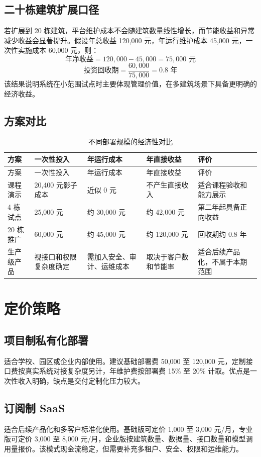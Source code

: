 \documentclass[12pt,a4paper]{ctexart}
\begin{document}
\subsection{二十栋建筑扩展口径}
若扩展到 20 栋建筑，平台维护成本不会随建筑数量线性增长，而节能收益和异常减少收益会显著提升。假设年总收益 120,000 元，年运行维护成本 45,000 元，一次性实施成本 60,000 元，则：
\[
\text{年净收益}=120,000-45,000=75,000 \text{ 元}
\]
\[
\text{投资回收期}=\frac{60,000}{75,000}=0.8 \text{ 年}
\]
该结果说明系统在小范围试点时主要体现管理价值，在多建筑场景下具备更明确的经济收益。

\subsection{方案对比}
\begin{longtable}{L{3cm}L{3.2cm}L{3.2cm}L{3.2cm}L{2cm}}
\caption{不同部署规模的经济性对比}\\
\toprule
方案 & 一次性投入 & 年运行成本 & 年直接收益 & 评价 \\
\midrule
\endfirsthead
\toprule
方案 & 一次性投入 & 年运行成本 & 年直接收益 & 评价 \\
\midrule
\endhead
课程演示 & 20,400 元影子成本 & 近似 0 元 & 不产生直接收入 & 适合课程验收和能力展示 \\
4 栋试点 & 25,000 元 & 约 30,000 元 & 约 42,000 元 & 第二年起具备正向收益 \\
20 栋推广 & 60,000 元 & 约 45,000 元 & 约 120,000 元 & 回收期约 0.8 年 \\
生产级产品 & 视接口和权限复杂度确定 & 需加入安全、审计、运维成本 & 取决于客户数和节能率 & 适合后续产品化，不属于本期范围 \\
\bottomrule
\end{longtable}

\section{定价策略}
\subsection{项目制私有化部署}
适合学校、园区或企业内部使用。建议基础部署费 50,000 至 120,000 元，定制接口费按真实系统对接复杂度另计，年维护费按部署费 15\% 至 20\% 计取。优点是一次性收入明确，缺点是交付定制化压力较大。

\subsection{订阅制 SaaS}
适合后续产品化和多客户标准化使用。基础版可定价 1,000 至 3,000 元/月，专业版可定价 3,000 至 8,000 元/月，企业版按建筑数量、数据量、接口数量和模型调用量报价。该模式现金流稳定，但需要补充多租户、安全、权限和运维能力。
\end{document}

